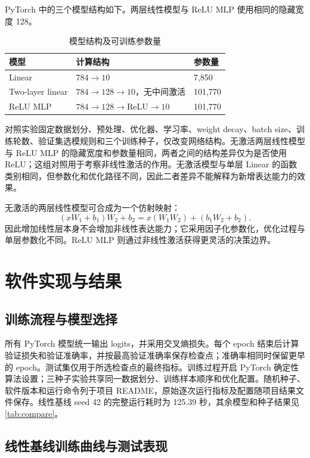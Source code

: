 \documentclass[dvipsnames,svgnames,a4paper,11pt]{article}
\begin{document}
PyTorch 中的三个模型结构如下。两层线性模型与 ReLU MLP 使用相同的隐藏宽度 128。

\begin{table}[H]
\centering
\caption{模型结构及可训练参数量}
\begin{tabular}{lll}
\toprule
模型 & 计算结构 & 参数量 \\
\midrule
Linear & $784\rightarrow10$ & 7,850 \\
Two-layer linear & $784\rightarrow128\rightarrow10$，无中间激活 & 101,770 \\
ReLU MLP & $784\rightarrow128\rightarrow\mathrm{ReLU}\rightarrow10$ & 101,770 \\
\bottomrule
\end{tabular}
\end{table}

对照实验固定数据划分、预处理、优化器、学习率、weight decay、batch size、训练轮数、验证集选模规则和三个训练种子，仅改变网络结构。无激活两层线性模型与 ReLU MLP 的隐藏宽度和参数量相同，两者之间的结构差异仅为是否使用 ReLU；这组对照用于考察非线性激活的作用。无激活模型与单层 Linear 的函数类别相同，但参数化和优化路径不同，因此二者差异不能解释为新增表达能力的效果。

无激活的两层线性模型可合成为一个仿射映射：
\[
 (xW_1+b_1)W_2+b_2=x(W_1W_2)+(b_1W_2+b_2).
\]
因此增加线性层本身不会增加非线性表达能力；它采用因子化参数化，优化过程与单层参数化不同。ReLU MLP 则通过非线性激活获得更灵活的决策边界。

\section{软件实现与结果}

\subsection{训练流程与模型选择}

所有 PyTorch 模型统一输出 logits，并采用交叉熵损失。每个 epoch 结束后计算验证损失和验证准确率，并按最高验证准确率保存检查点；准确率相同时保留更早的 epoch。测试集仅用于所选检查点的最终指标。训练过程开启 PyTorch 确定性算法设置；三种子实验共享同一数据划分、训练样本顺序和优化配置。随机种子、软件版本和运行命令列于项目 README，原始逐次运行指标及配置随项目结果文件保存。线性基线 seed 42 的完整运行耗时为 125.39 秒，其余模型和种子结果见\cref{tab:compare}。

\subsection{线性基线训练曲线与测试表现}
\end{document}
